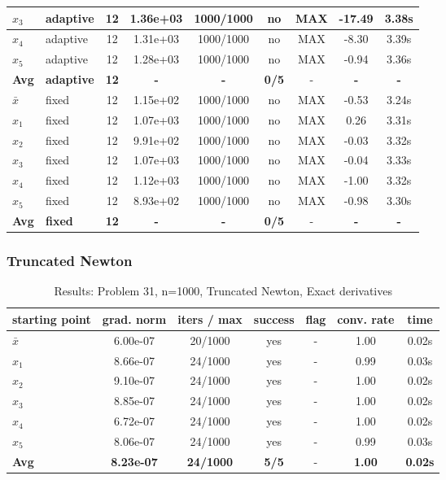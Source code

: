 \begin{longtable}{|l|l|c|c|c|c|c|c|c|}
\hline
$x_3$ & adaptive & 12 & 1.36e+03 & 1000/1000 & no & MAX & -17.49 & 3.38s \\
\hline
$x_4$ & adaptive & 12 & 1.31e+03 & 1000/1000 & no & MAX & -8.30 & 3.39s \\
\hline
$x_5$ & adaptive & 12 & 1.28e+03 & 1000/1000 & no & MAX & -0.94 & 3.36s \\
\hline
\hline\hline
\textbf{Avg} & \textbf{adaptive} & \textbf{12} & \textbf{-} & \textbf{-} & \textbf{0/5} & - & \textbf{-} & \textbf{-} \\
\hline\hline
\hline
$\bar{x}$ & fixed & 12 & 1.15e+02 & 1000/1000 & no & MAX & -0.53 & 3.24s \\
\hline
$x_1$ & fixed & 12 & 1.07e+03 & 1000/1000 & no & MAX & 0.26 & 3.31s \\
\hline
$x_2$ & fixed & 12 & 9.91e+02 & 1000/1000 & no & MAX & -0.03 & 3.32s \\
\hline
$x_3$ & fixed & 12 & 1.07e+03 & 1000/1000 & no & MAX & -0.04 & 3.33s \\
\hline
$x_4$ & fixed & 12 & 1.12e+03 & 1000/1000 & no & MAX & -1.00 & 3.32s \\
\hline
$x_5$ & fixed & 12 & 8.93e+02 & 1000/1000 & no & MAX & -0.98 & 3.30s \\
\hline
\hline\hline
\textbf{Avg} & \textbf{fixed} & \textbf{12} & \textbf{-} & \textbf{-} & \textbf{0/5} & - & \textbf{-} & \textbf{-} \\
\hline\hline
\end{longtable}


\subsubsection{Truncated Newton}

\begin{longtable}{|l|c|c|c|c|c|c|}
\caption{Results: Problem 31, n=1000, Truncated Newton, Exact derivatives} \\
\hline
\textbf{starting point} & \textbf{grad. norm} & \textbf{iters / max} & \textbf{success} & \textbf{flag} & \textbf{conv. rate} & \textbf{time} \\
\hline
\endfirsthead
\endhead
\endfoot
\hline
\endlastfoot
$\bar{x}$ & 6.00e-07 & 20/1000 & yes & - & 1.00 & 0.02s \\
\hline
$x_1$ & 8.66e-07 & 24/1000 & yes & - & 0.99 & 0.03s \\
\hline
$x_2$ & 9.10e-07 & 24/1000 & yes & - & 1.00 & 0.02s \\
\hline
$x_3$ & 8.85e-07 & 24/1000 & yes & - & 1.00 & 0.02s \\
\hline
$x_4$ & 6.72e-07 & 24/1000 & yes & - & 1.00 & 0.02s \\
\hline
$x_5$ & 8.06e-07 & 24/1000 & yes & - & 0.99 & 0.03s \\
\hline
\hline\hline
\textbf{Avg} & \textbf{8.23e-07} & \textbf{24/1000} & \textbf{5/5} & - & \textbf{1.00} & \textbf{0.02s} \\
\hline\hline
\end{longtable}



